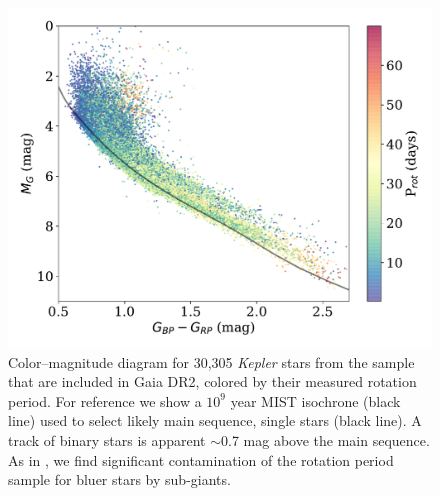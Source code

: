 \documentclass[preprint2]{aastex62}
\newcommand{\Kepler}{\textsl{Kepler}\xspace}
\begin{document}
\begin{figure}[]
\centering
\includegraphics[width=6in]{../figures/cmd}
\caption{
Color--magnitude diagram for 30,305 \Kepler stars from the \citet{mcquillan2014} sample that are included in Gaia DR2, colored by their measured rotation period. For reference we show a $10^9$ year MIST isochrone (black line) used to select likely main sequence, single stars (black line). A track of binary  stars is apparent $\sim$0.7 mag above the main sequence. As in \citet{davenport2017}, we find significant contamination of the rotation period sample for bluer stars by sub-giants.}
\label{fig:cmd}
\end{figure}
\end{document}
